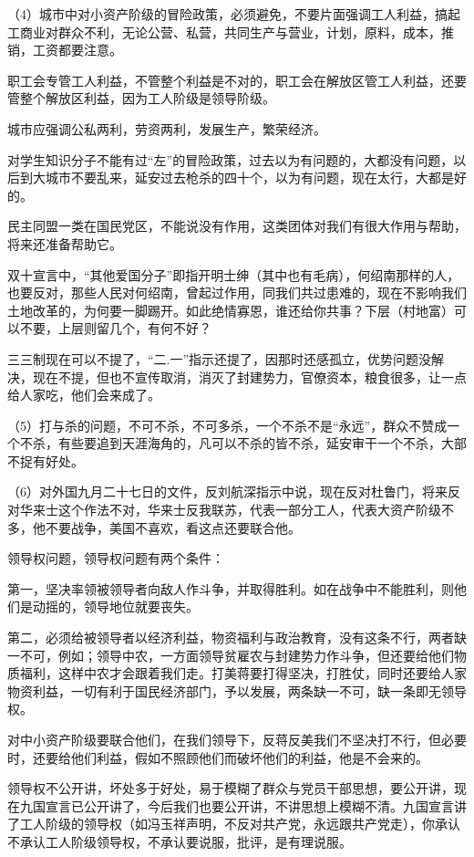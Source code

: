 （4）城市中对小资产阶级的冒险政策，必须避免，不要片面强调工人利益，搞起工商业对群众不利，无论公营、私营，共同生产与营业，计划，原料，成本，推销，工资都要注意。

职工会专管工人利益，不管整个利益是不对的，职工会在解放区管工人利益，还要管整个解放区利益，因为工人阶级是领导阶级。

城市应强调公私两利，劳资两利，发展生产，繁荣经济。

对学生知识分子不能有过“左”的冒险政策，过去以为有问题的，大都没有问题，以后到大城市不要乱来，延安过去枪杀的四十个，以为有问题，现在太行，大都是好的。

民主同盟一类在国民党区，不能说没有作用，这类团体对我们有很大作用与帮助，将来还准备帮助它。

双十宣言中，“其他爱国分子”即指开明士绅（其中也有毛病），何绍南那样的人，也要反对，那些人民对何绍南，曾起过作用，同我们共过患难的，现在不影响我们土地改革的，为何要一脚踢开。如此绝情寡恩，谁还给你共事？下层（村地富）可以不要，上层则留几个，有何不好？

三三制现在可以不提了，“二.一”指示还提了，因那时还感孤立，优势问题没解决，现在不提，但也不宣传取消，消灭了封建势力，官僚资本，粮食很多，让一点给人家吃，他们会来成了。

（5）打与杀的问题，不可不杀，不可多杀，一个不杀不是“永远”，群众不赞成一个不杀，有些要追到天涯海角的，凡可以不杀的皆不杀，延安审干一个不杀，大部不捉有好处。

（6）对外国九月二十七日的文件，反刘航深指示中说，现在反对杜鲁门，将来反对华来士这个作法不对，华来士反我联苏，代表一部分工人，代表大资产阶级不多，他不要战争，美国不喜欢，看这点还要联合他。

领导权问题，领导权问题有两个条件：

第一，坚决率领被领导者向敌人作斗争，并取得胜利。如在战争中不能胜利，则他们是动摇的，领导地位就要丧失。

第二，必须给被领导者以经济利益，物资福利与政治教育，没有这条不行，两者缺一不可，例如；领导中农，一方面领导贫雇农与封建势力作斗争，但还要给他们物质福利，这样中农才会跟着我们走。打美蒋要打得坚决，打胜仗，同时还要给人家物资利益，一切有利于国民经济部门，予以发展，两条缺一不可，缺一条即无领导权。

对中小资产阶级要联合他们，在我们领导下，反蒋反美我们不坚决打不行，但必要时，还要给他们利益，假如不照顾他们而破坏他们的利益，他是不会来的。

领导权不公开讲，坏处多于好处，易于模糊了群众与党员干部思想，要公开讲，现在九国宣言已公开讲了，今后我们也要公开讲，不讲思想上模糊不清。九国宣言讲了工人阶级的领导权（如冯玉祥声明，不反对共产党，永远跟共产党走），你承认不承认工人阶级领导权，不承认要说服，批评，是有理说服。

